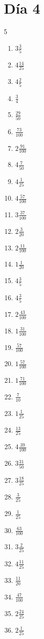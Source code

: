 \documentclass[12pt]{article}
\begin{document}
\section*{Día 4}
\begin{multicols}{5}\begin{enumerate}
\item $ 3 \frac{3}{5} $
\item $ 4 \frac{14}{25} $
\item $ 4 \frac{2}{5} $
\item $ \frac{3}{4} $
\item $ \frac{29}{50} $
\item $ \frac{73}{100} $
\item $ 2 \frac{91}{100} $
\item $ 4 \frac{7}{50} $
\item $ 4 \frac{1}{25} $
\item $ 4 \frac{57}{100} $
\item $ 3 \frac{37}{100} $
\item $ 2 \frac{3}{20} $
\item $ 2 \frac{11}{100} $
\item $ 1 \frac{1}{20} $
\item $ 4 \frac{3}{5} $
\item $ 4 \frac{3}{5} $
\item $ 2 \frac{43}{100} $
\item $ 1 \frac{31}{100} $
\item $ \frac{57}{100} $
\item $ 1 \frac{57}{100} $
\item $ 1 \frac{71}{100} $
\item $ \frac{7}{10} $
\item $ 1 \frac{1}{25} $
\item $ \frac{13}{25} $
\item $ 4 \frac{39}{100} $
\item $ 3 \frac{31}{50} $
\item $ 3 \frac{18}{25} $
\item $ \frac{3}{25} $
\item $ \frac{1}{25} $
\item $ \frac{63}{100} $
\item $ 3 \frac{2}{25} $
\item $ 4 \frac{11}{25} $
\item $ \frac{11}{20} $
\item $ \frac{47}{100} $
\item $ 2 \frac{24}{25} $
\item $ 2 \frac{1}{25} $

\end{enumerate}
\end{multicols}
\end{document}
